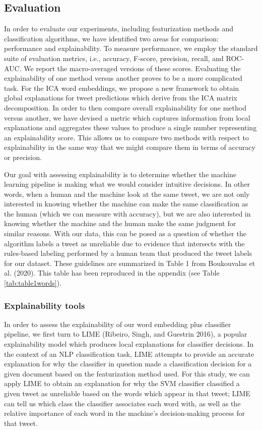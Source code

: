 \documentclass{article}
\begin{document}
\hypertarget{evaluation}{%
\subsection{Evaluation}\label{evaluation}}

In order to evaluate our experiments, including featurization methods
and classification algorithms, we have identified two areas for
comparison: performance and explainability. To measure performance, we
employ the standard suite of evaluation metrics, i.e., accuracy,
F-score, precision, recall, and ROC-AUC. We report the macro-averaged
versions of these scores. Evaluating the explainability of one method
versus another proves to be a more complicated task. For the ICA word
embeddings, we propose a new framework to obtain global explanations for
tweet predictions which derive from the ICA matrix decomposition. In
order to then compare overall explainability for one method versus
another, we have devised a metric which captures information from local
explanations and aggregates these values to produce a single number
representing an explainability score. This allows us to compare two
methods with respect to explainability in the same way that we might
compare them in terms of accuracy or precision.

Our goal with assessing explainability is to determine whether the
machine learning pipeline is making what we would consider intuitive
decisions. In other words, when a human and the machine look at the same
tweet, we are not only interested in knowing whether the machine can
make the same classification as the human (which we can measure with
accuracy), but we are also interested in knowing whether the machine and
the human make the same judgment for similar reasons. With our data,
this can be posed as a question of whether the algorithm labels a tweet
as unreliable due to evidence that intersects with the rules-based
labeling performed by a human team that produced the tweet labels for
our dataset. These guidelines are summarized in Table 1 from Boukouvalas
et al. (2020). This table has been reproduced in the appendix (see Table
\ref{tab:table1words}).

\hypertarget{explainability-tools}{%
\subsubsection{Explainability tools}\label{explainability-tools}}

In order to assess the explainability of our word embedding plus
classifier pipeline, we first turn to LIME (Ribeiro, Singh, and Guestrin
2016), a popular explainability model which produces local explanations
for classifier decisions. In the context of an NLP classification task,
LIME attempts to provide an accurate explanation for why the classifier
in question made a classification decision for a given document based on
the featurization method used. For this study, we can apply LIME to
obtain an explanation for why the SVM classifier classified a given
tweet as unreliable based on the words which appear in that tweet; LIME
can tell us which class the classifier associates each word with, as
well as the relative importance of each word in the machine's
decision-making process for that tweet.
\end{document}
